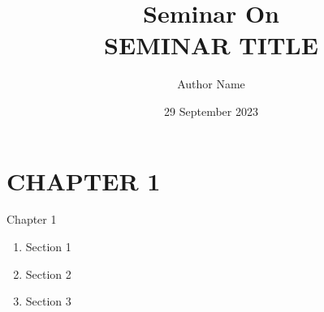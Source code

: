 \documentclass{beamer}
\title{Seminar On \\ \vspace{0.5ex}SEMINAR TITLE}
\author{\large{Author Name}}
\institute{hhhh}
\date{29 September 2023}
\newcommand{\hrefcol}[2]{\textcolor{cyan}{\href{#1}{#2}}}
\begin{document}

\maketitle










% 
\section{CHAPTER 1}
\begin{chapter}{}{Chapter 1}
    \begin{enumerate}
        \item Section 1
        \item Section 2
        \item Section 3
    \end{enumerate}
\end{chapter}
\end{document}
